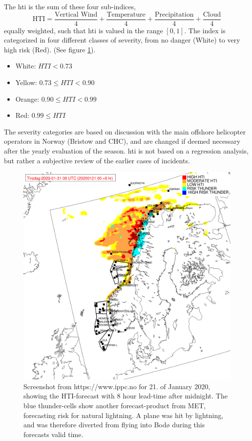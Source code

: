 The \acrshort{hti} is the sum of these four sub-indices, \[\text{HTI} = \frac{\text{Vertical Wind}}{4} + \frac{\text{Temperature}}{4} + \frac{\text{Precipitation}}{4} +\frac{\text{Cloud}}{4}\] equally weighted, such that \acrshort{hti} is valued in the range $[0,1]$. The index is categorized in four different classes of severity, from no danger (White) to very high risk (Red). (See figure \ref{fig:hti}).
\begin{itemize}
    \item White: $HTI < 0.73$
    \item Yellow: $0.73 \leq HTI < 0.90 $
    \item Orange: $0.90 \leq HTI < 0.99 $
    \item Red: $0.99 \leq HTI $
\end{itemize}
The severity categories are based on discussion with the main offshore helicopter operators in Norway (Bristow and CHC), and are changed if deemed necessary after the yearly evaluation of the season. \acrshort{hti} is not based on a regression analysis, but rather a subjective review of the earlier cases of incidents.

\begin{figure}
    \centering
    \includegraphics[width=\textwidth]{Figures/hti.png}
    \caption{Screenshot from https://www.ippc.no for 21. of January 2020, showing the HTI-forecast with 8 hour lead-time after midnight. The blue thunder-cells show another forecast-product from MET, forecasting risk for natural lightning. A plane was hit by lightning, and was therefore diverted from flying into Bodø during this forecasts valid time. }
    \label{fig:hti}
\end{figure}

